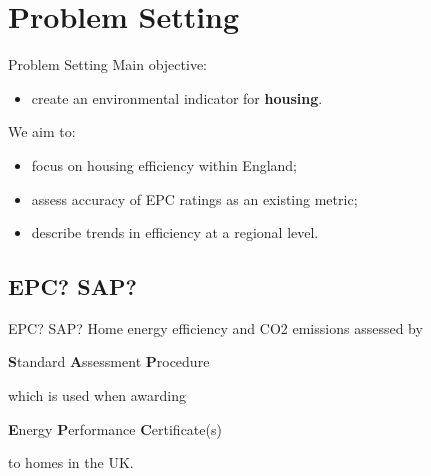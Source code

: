 \section{Problem Setting}

\begin{frame}{Problem Setting}
    Main objective:
    
    \begin{itemize}
        \item create an environmental indicator for \textbf{housing}.
    \end{itemize}
    
    \vspace{2.0 em}

    We aim to:

    \begin{itemize}
        \item focus on housing efficiency within England;
        \item assess accuracy of EPC ratings as an existing metric;
        \item describe trends in efficiency at a regional level.
    \end{itemize}
\end{frame}

\subsection{EPC? SAP?}

\begin{frame}{EPC? SAP?}
    Home energy efficiency and CO2 emissions assessed by 

    \begin{center}
        \textbf{S}tandard \textbf{A}ssessment \textbf{P}rocedure
    \end{center}

    which is used when awarding

    \begin{center}
        \textbf{E}nergy \textbf{P}erformance \textbf{C}ertificate(s)
    \end{center}

    to homes in the UK.
\end{frame}


